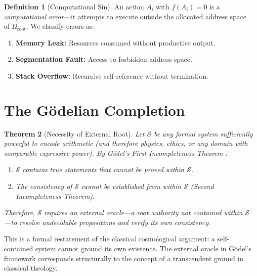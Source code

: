\documentclass[12pt, a4paper]{article}
\theoremstyle{plain}
\newtheorem{theorem}{Theorem}[section]
\theoremstyle{definition}
\newtheorem{definition}[theorem]{Definition}
\begin{document}
\begin{definition}[Computational Sin]\label{def:sin}
  An action $A_i$ with $f(A_i) = 0$ is a \emph{computational error}---it
  attempts to execute outside the allocated address space of
  $\Omega_{\text{root}}$. We classify errors as:
  \begin{enumerate}[label=(\roman*)]
    \item \textbf{Memory Leak:} Resources consumed without productive output.
    \item \textbf{Segmentation Fault:} Access to forbidden address space.
    \item \textbf{Stack Overflow:} Recursive self-reference without termination.
  \end{enumerate}
\end{definition}

\section{The G\"odelian Completion}\label{sec:godelian}

\begin{theorem}[Necessity of External Root]\label{thm:godelian}
  Let $\mathcal{S}$ be any formal system sufficiently powerful to encode
  arithmetic (and therefore physics, ethics, or any domain with comparable
  expressive power). By G\"odel's First Incompleteness Theorem
  \citep{Godel1931}:
  \begin{enumerate}[label=(\alph*)]
    \item $\mathcal{S}$ contains true statements that cannot be proved
      within $\mathcal{S}$.
    \item The consistency of $\mathcal{S}$ cannot be established from
      within $\mathcal{S}$ (Second Incompleteness Theorem).
  \end{enumerate}
  Therefore, $\mathcal{S}$ requires an \emph{external oracle}---a root
  authority not contained within $\mathcal{S}$---to resolve undecidable
  propositions and verify its own consistency.
\end{theorem}

\begin{remark}
  This is a formal restatement of the classical cosmological argument:
  a self-contained system cannot ground its own existence. The external
  oracle in G\"odel's framework corresponds structurally to the concept
  of a transcendent ground in classical theology.
\end{remark}
\end{document}
